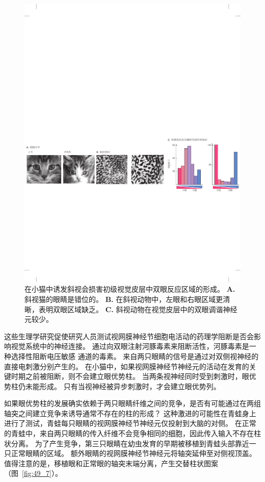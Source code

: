 \begin{figure}[htbp]
	\centering
	\includegraphics[width=0.85\linewidth]{chap49/fig_49_6}
	\caption{在小猫中诱发斜视会损害初级视觉皮层中双眼反应区域的形成。
		\textbf{A.} 斜视猫的眼睛是错位的。
		\textbf{B.} 在斜视动物中，左眼和右眼区域更清晰，表明双眼区域缺乏。
		\textbf{C.} 斜视动物在视觉皮层中的双眼调谐神经元较少。}
	\label{fig:49_6}
\end{figure}


这些生理学研究促使研究人员测试视网膜神经节细胞电活动的药理学阻断是否会影响视觉系统中的神经连接。
通过向双眼注射河豚毒素来阻断活性，河豚毒素是一种选择性阻断电压敏感  通道的毒素。
来自两只眼睛的信号是通过对双侧视神经的直接电刺激分别产生的。
在小猫中，如果视网膜神经节神经元的活动在发育的关键时期之前被阻断，则不会建立眼优势柱。
当两条视神经同时受到刺激时，眼优势柱仍未能形成。
只有当视神经被异步刺激时，才会建立眼优势列。


如果眼优势柱的发展确实依赖于两只眼睛纤维之间的竞争，是否有可能通过在两组轴突之间建立竞争来诱导通常不存在的柱的形成？
这种激进的可能性在青蛙身上进行了测试，青蛙每只眼睛的视网膜神经节神经元仅投射到大脑的对侧。
在正常的青蛙中，来自两只眼睛的传入纤维不会竞争相同的细胞，因此传入输入不存在柱状分离。
为了产生竞争，第三只眼睛在幼虫发育的早期被移植到青蛙头部靠近一只正常眼睛的区域。
额外眼睛的视网膜神经节神经元将轴突延伸至对侧视顶盖。
值得注意的是，移植眼和正常眼的轴突末端分离，产生交替柱状图案（图~\ref{fig:49_7}）。


